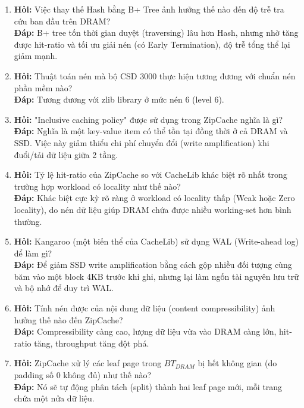 \documentclass[12pt,a4paper]{article}
\begin{document}
\begin{enumerate}
    \item \textbf{Hỏi:} Việc thay thế Hash bằng B+ Tree ảnh hưởng thế nào đến độ trễ tra cứu ban đầu trên DRAM? \\
    \textbf{Đáp:} B+ tree tốn thời gian duyệt (traversing) lâu hơn Hash, nhưng nhờ tăng được hit-ratio và tối ưu giải nén (có Early Termination), độ trễ tổng thể lại giảm mạnh.
    
    \item \textbf{Hỏi:} Thuật toán nén mà bộ CSD 3000 thực hiện tương đương với chuẩn nén phần mềm nào? \\
    \textbf{Đáp:} Tương đương với zlib library ở mức nén 6 (level 6).
    
    \item \textbf{Hỏi:} "Inclusive caching policy" được sử dụng trong ZipCache nghĩa là gì? \\
    \textbf{Đáp:} Nghĩa là một key-value item có thể tồn tại đồng thời ở cả DRAM và SSD. Việc này giảm thiểu chi phí chuyển đổi (write amplification) khi đuổi/tải dữ liệu giữa 2 tầng.
    
    \item \textbf{Hỏi:} Tỷ lệ hit-ratio của ZipCache so với CacheLib khác biệt rõ nhất trong trường hợp workload có locality như thế nào? \\
    \textbf{Đáp:} Khác biệt cực kỳ rõ ràng ở workload có locality thấp (Weak hoặc Zero locality), do nén dữ liệu giúp DRAM chứa được nhiều working-set hơn bình thường.
    
    \item \textbf{Hỏi:} Kangaroo (một biến thể của CacheLib) sử dụng WAL (Write-ahead log) để làm gì? \\
    \textbf{Đáp:} Để giảm SSD write amplification bằng cách gộp nhiều đối tượng cùng băm vào một block 4KB trước khi ghi, nhưng lại làm ngốn tài nguyên lưu trữ và bộ nhớ để duy trì WAL.
    
    \item \textbf{Hỏi:} Tính nén được của nội dung dữ liệu (content compressibility) ảnh hưởng thế nào đến ZipCache? \\
    \textbf{Đáp:} Compressibility càng cao, lượng dữ liệu vừa vào DRAM càng lớn, hit-ratio tăng, throughput tăng đột phá.
    
    \item \textbf{Hỏi:} ZipCache xử lý các leaf page trong $BT_{DRAM}$ bị hết không gian (do padding số 0 không đủ) như thế nào? \\
    \textbf{Đáp:} Nó sẽ tự động phân tách (split) thành hai leaf page mới, mỗi trang chứa một nửa dữ liệu.
    

\end{enumerate}
\end{document}

